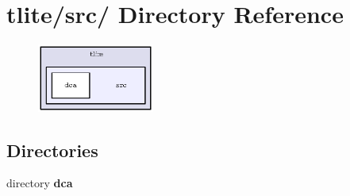 \section{tlite/src/ Directory Reference}
\label{dir_6eb8832c0eb1a0f8b3ecc732e66c412e}


\begin{figure}[H]
\begin{center}
\leavevmode
\includegraphics[width=109pt]{dir_6eb8832c0eb1a0f8b3ecc732e66c412e_dep}
\end{center}
\end{figure}
\subsection*{Directories}
\begin{CompactItemize}
\item 
directory \bf{dca}
\end{CompactItemize}
